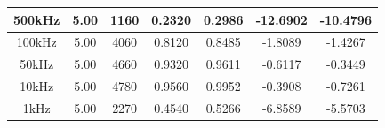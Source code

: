 \documentclass{article}
\begin{document}
\begin{table}[H]
\begin{tabular}{|c|c|c|c|c|c|c|}
		500kHz    & 5.00                                                                    & 1160                                                                           & 0.2320                                                                  & 0.2986                                                                             & -12.6902                                                                        & -10.4796                                                                                   \\ \hline
		100kHz    & 5.00                                                                    & 4060                                                                           & 0.8120                                                                  & 0.8485                                                                             & -1.8089                                                                         & -1.4267                                                                                    \\ \hline
		50kHz     & 5.00                                                                    & 4660                                                                           & 0.9320                                                                  & 0.9611                                                                             & -0.6117                                                                         & -0.3449                                                                                    \\ \hline
		10kHz     & 5.00                                                                    & 4780                                                                           & 0.9560                                                                  & 0.9952                                                                             & -0.3908                                                                         & -0.7261                                                                                    \\ \hline
		1kHz      & 5.00                                                                    & 2270                                                                           & 0.4540                                                                  & 0.5266                                                                             & -6.8589                                                                         & -5.5703                                                                                    \\ \hline

\end{tabular}
\end{table}
\end{document}

